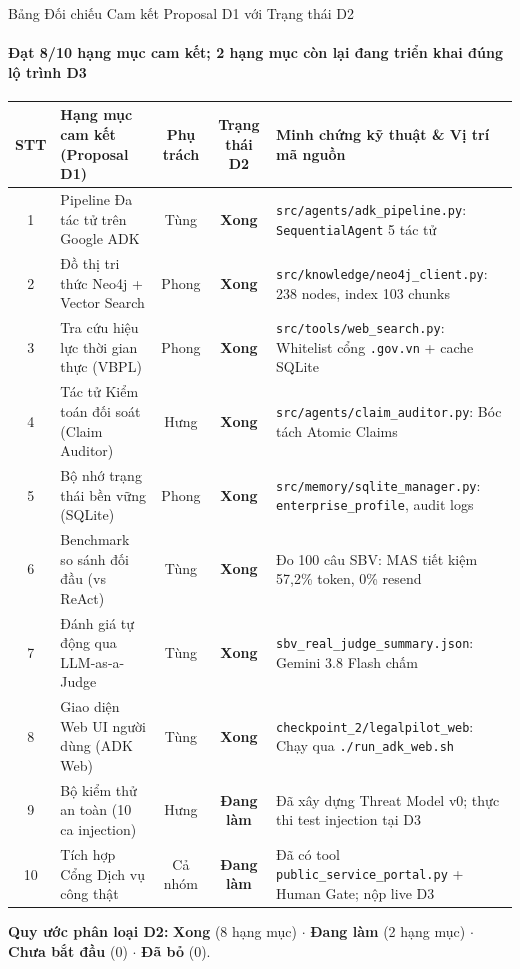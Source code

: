 \documentclass[aspectratio=169,10pt,xcolor={table}]{beamer}
\begin{document}
\begin{frame}{Bảng Đối chiếu Cam kết Proposal D1 với Trạng thái D2}
\framesubtitle{Đạt 8/10 hạng mục cam kết; 2 hạng mục còn lại đang triển khai đúng lộ trình D3}
\centering
\scriptsize
\begin{tabularx}{0.98\linewidth}{@{}clccX@{}}
\toprule
\textbf{STT} & \textbf{Hạng mục cam kết (Proposal D1)} & \textbf{Phụ trách} & \textbf{Trạng thái D2} & \textbf{Minh chứng kỹ thuật \& Vị trí mã nguồn} \\ \midrule
1 & Pipeline Đa tác tử trên Google ADK & Tùng & \textbf{\color{darkgreen}Xong} & \texttt{src/agents/adk\_pipeline.py}: \texttt{SequentialAgent} 5 tác tử \\
2 & Đồ thị tri thức Neo4j + Vector Search & Phong & \textbf{\color{darkgreen}Xong} & \texttt{src/knowledge/neo4j\_client.py}: 238 nodes, index 103 chunks \\
3 & Tra cứu hiệu lực thời gian thực (VBPL) & Phong & \textbf{\color{darkgreen}Xong} & \texttt{src/tools/web\_search.py}: Whitelist cổng \texttt{.gov.vn} + cache SQLite \\
4 & Tác tử Kiểm toán đối soát (Claim Auditor) & Hưng & \textbf{\color{darkgreen}Xong} & \texttt{src/agents/claim\_auditor.py}: Bóc tách Atomic Claims \\
5 & Bộ nhớ trạng thái bền vững (SQLite) & Phong & \textbf{\color{darkgreen}Xong} & \texttt{src/memory/sqlite\_manager.py}: \texttt{enterprise\_profile}, audit logs \\
6 & Benchmark so sánh đối đầu (vs ReAct) & Tùng & \textbf{\color{darkgreen}Xong} & Đo 100 câu SBV: MAS tiết kiệm 57,2\% token, 0\% resend \\
7 & Đánh giá tự động qua LLM-as-a-Judge & Tùng & \textbf{\color{darkgreen}Xong} & \texttt{sbv\_real\_judge\_summary.json}: Gemini 3.8 Flash chấm \\
8 & Giao diện Web UI người dùng (ADK Web) & Tùng & \textbf{\color{darkgreen}Xong} & \texttt{checkpoint\_2/legalpilot\_web}: Chạy qua \texttt{./run\_adk\_web.sh} \\ \midrule
9 & Bộ kiểm thử an toàn (10 ca injection) & Hưng & \textbf{\color{alertorange}Đang làm} & Đã xây dựng Threat Model v0; thực thi test injection tại D3 \\
10 & Tích hợp Cổng Dịch vụ công thật & Cả nhóm & \textbf{\color{alertorange}Đang làm} & Đã có tool \texttt{public\_service\_portal.py} + Human Gate; nộp live D3 \\
\bottomrule
\end{tabularx}
\vskip0.08cm
{\tiny\textbf{Quy ước phân loại D2:} \textbf{\color{darkgreen}Xong} (8 hạng mục) $\cdot$ \textbf{\color{alertorange}Đang làm} (2 hạng mục) $\cdot$ \textbf{Chưa bắt đầu} (0) $\cdot$ \textbf{Đã bỏ} (0).}
\end{frame}
\end{document}
